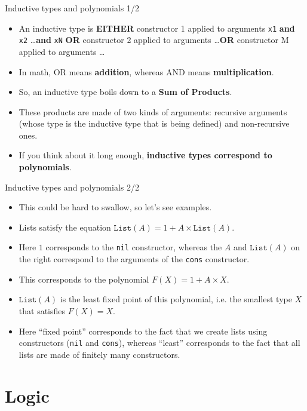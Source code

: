 \documentclass{beamer}
\newcommand{\m}[1]{\texttt{#1}}
\begin{document}
\begin{frame}{Inductive types and polynomials 1/2}
\begin{itemize}
	\item An inductive type is \textbf{EITHER} constructor 1 applied to arguments \m{x1} \textbf{and} \m{x2} \dots \textbf{and} \m{xN} \textbf{OR} constructor 2 applied to arguments \dots \textbf{OR} constructor M applied to arguments \dots
	\item In math, OR means \textbf{addition}, whereas AND means \textbf{multiplication}.
	\item So, an inductive type boils down to a \textbf{Sum of Products}.
	\item These products are made of two kinds of arguments: recursive arguments (whose type is the inductive type that is being defined) and non-recursive ones.
	\item If you think about it long enough, \textbf{inductive types correspond to polynomials}.
\end{itemize}
\end{frame}

\begin{frame}{Inductive types and polynomials 2/2}
\begin{itemize}
	\item This could be hard to swallow, so let's see examples.
	\item Lists satisfy the equation $\m{List}(A) = 1 + A \times \m{List}(A)$.
	\item Here $1$ corresponds to the \m{nil} constructor, whereas the $A$ and $\m{List}(A)$ on the right correspond to the arguments of the \m{cons} constructor.
	\item This corresponds to the polynomial $F(X) = 1 + A \times X$.
	\item $\m{List}(A)$ is the least fixed point of this polynomial, i.e. the smallest type $X$ that satisfies $F(X) = X$.
	\item Here ``fixed point'' corresponds to the fact that we create lists using constructors (\m{nil} and \m{cons}), whereas ``least'' corresponds to the fact that all lists are made of finitely many constructors.
\end{itemize}
\end{frame}

\section{Logic}
\end{document}
